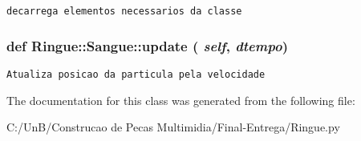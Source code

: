 \begin{footnotesize}\begin{verbatim}decarrega elementos necessarios da classe \end{verbatim}
\end{footnotesize}
 \hypertarget{class_ringue_1_1_sangue_21053d5c58557427f5d36d58b7982543}{
\subsubsection[{update}]{\setlength{\rightskip}{0pt plus 5cm}def Ringue::Sangue::update ( {\em self}, \/   {\em dtempo})}}
\label{class_ringue_1_1_sangue_21053d5c58557427f5d36d58b7982543}




\begin{footnotesize}\begin{verbatim}Atualiza posicao da particula pela velocidade \end{verbatim}
\end{footnotesize}
 

The documentation for this class was generated from the following file:\begin{CompactItemize}
\item 
C:/UnB/Construcao de Pecas Multimidia/Final-Entrega/Ringue.py\end{CompactItemize}
